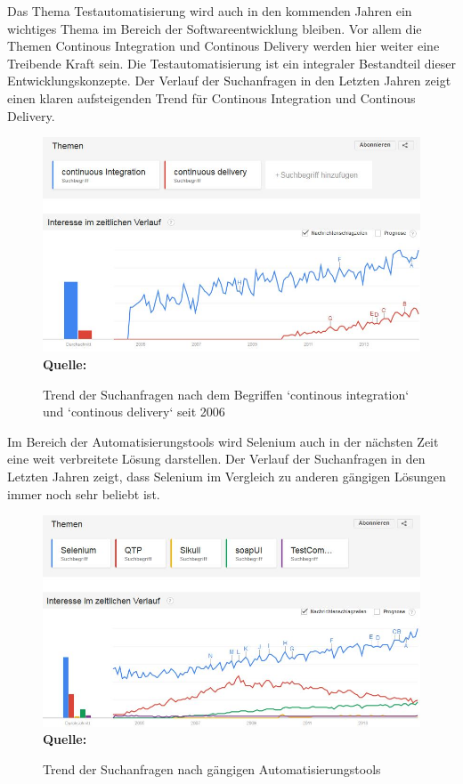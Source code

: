 Das Thema Testautomatisierung wird auch in den kommenden Jahren ein wichtiges Thema im Bereich der Softwareentwicklung bleiben. Vor allem die Themen Continous Integration und Continous Delivery werden hier weiter eine Treibende Kraft sein. Die Testautomatisierung ist ein integraler Bestandteil dieser Entwicklungskonzepte. Der Verlauf der Suchanfragen in den Letzten Jahren zeigt einen klaren aufsteigenden Trend für Continous Integration und Continous Delivery.
\begin{figure}[htb]
  \centering  
  \includegraphics[scale=0.75]{img/cdTrend.JPG}\\
  \footnotesize\sffamily\textbf{Quelle:} \cite{google_google_2014}
  \caption{Trend der Suchanfragen nach dem Begriffen ‘continous integration‘ und ‘continous delivery‘ seit 2006}
  \label{fig:cdTrend}
\end{figure}

Im Bereich der Automatisierungstools wird Selenium auch in der nächsten Zeit eine weit verbreitete Lösung darstellen. Der Verlauf der Suchanfragen in den Letzten Jahren zeigt, dass Selenium im Vergleich zu anderen gängigen Lösungen immer noch sehr beliebt ist.

\begin{figure}[htb]
  \centering  
  \includegraphics[scale=0.75]{img/autoToolsTrend.JPG}\\
  \footnotesize\sffamily\textbf{Quelle:} \cite{google_google_2014}
  \caption{Trend der Suchanfragen nach gängigen Automatisierungstools}
  \label{fig:cdTrend}
\end{figure}